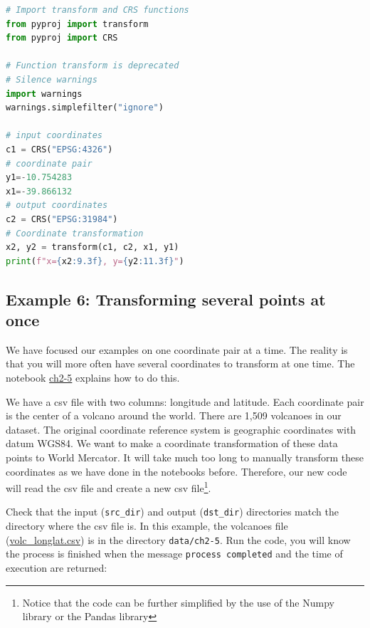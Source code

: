 \documentclass[a4paper , 12pt]{book}
\newcommand{\code}[1]{\colorbox{light-gray}{\texttt{#1}}}
\begin{document}
\begin{center}
\begin{lstlisting}[language=Python, frame=single]
# Import transform and CRS functions
from pyproj import transform
from pyproj import CRS

# Function transform is deprecated
# Silence warnings
import warnings 
warnings.simplefilter("ignore")

# input coordinates
c1 = CRS("EPSG:4326")
# coordinate pair
y1=-10.754283
x1=-39.866132
# output coordinates
c2 = CRS("EPSG:31984")
# Coordinate transformation
x2, y2 = transform(c1, c2, x1, y1)
print(f"x={x2:9.3f}, y={y2:11.3f}")
\end{lstlisting}
\end{center}

\subsection*{Example 6: Transforming several points at once}

We have focused our examples on one coordinate pair at a time. The reality is that you will more often have several coordinates to transform at one time. The notebook \href{https://github.com/nfcd/compGeo/blob/master/source/notebooks/ch2-5.ipynb}{ch2-5} explains how to do this.

We have a csv file with two columns: longitude and latitude. Each coordinate pair is the center of a volcano around the world. There are 1,509 volcanoes in our dataset. The original coordinate reference system is geographic coordinates with datum WGS84. We want to make a coordinate transformation of these data points to World Mercator. It will take much too long to manually transform these coordinates as we have done in the notebooks before. Therefore, our new code will read the csv file and create a new csv file\footnote{Notice that the code can be further simplified by the use of the Numpy library or the Pandas library}.

Check that the input (\code{src\_dir}) and output (\code{dst\_dir}) directories match the directory where the csv file is. In this example, the volcanoes file \newline (\href{https://github.com/nfcd/compGeo/blob/master/source/data/ch2-5/volc_longlat.csv}{volc\_longlat.csv}) is in the directory \code{data/ch2-5}. Run the code, you will know the process is finished when the message \code{process completed} and the time of execution are returned:
\end{document}
